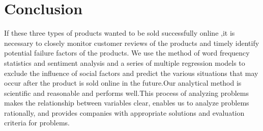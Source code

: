 \documentclass[12pt]{article}
\begin{document}
\section{Conclusion}
\quad\par
If these three types of products wanted to be sold successfully online ,it is necessary to closely monitor customer reviews of the products and timely identify potential failure factors of the products. 
 We use the method of word frequency statistics and sentiment analysis and a series of multiple regression models to exclude the influence of social factors and predict the various situations that may occur after the product is sold online in the future.Our analytical method is scientific and reasonable and performs well.This process of analyzing problems makes the relationship between variables clear, enables us to analyze problems rationally, and provides companies with appropriate solutions and evaluation criteria for problems.










\end{document}
